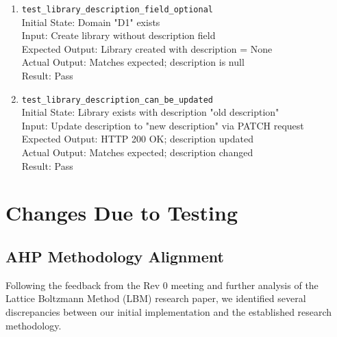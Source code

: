 \documentclass[12pt, titlepage]{article}
\begin{document}
\begin{enumerate}
    \item \texttt{test\_library\_description\_field\_optional} \label{test-library-description-field-optional}
      \\Initial State: Domain "D1" exists
      \\Input: Create library without description field
      \\Expected Output: Library created with description = None
      \\Actual Output: Matches expected; description is null
      \\Result: Pass

    \item \texttt{test\_library\_description\_can\_be\_updated} \label{test-library-description-can-be-updated}
      \\Initial State: Library exists with description "old description"
      \\Input: Update description to "new description" via PATCH request
      \\Expected Output: HTTP 200 OK; description updated
      \\Actual Output: Matches expected; description changed
      \\Result: Pass
  \end{enumerate}

\section{Changes Due to Testing}

\subsection{AHP Methodology Alignment}
Following the feedback from the Rev 0 meeting and further analysis of the Lattice Boltzmann Method (LBM) research paper, we identified several discrepancies between our initial implementation and the established research methodology.
\end{document}
